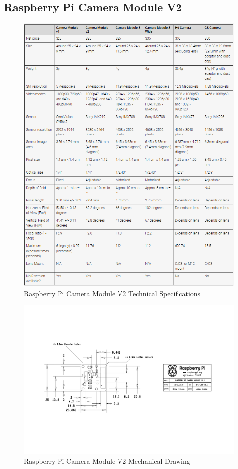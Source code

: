 \subsection{Raspberry Pi Camera Module V2}

\begin{figure}[H]
    \centering
    \includegraphics[width=0.85\linewidth]{texs/appendix/data/techspecs/cameraspecs.png}
    \caption{Raspberry Pi Camera Module V2 Technical Specifications}
    \label{fig:picam-1}
\end{figure}

\begin{figure}[H]
    \centering
    \includegraphics[width=\linewidth, angle=90]{texs/appendix/data/techspecs/cameramechdraw.jpg}
    \caption{Raspberry Pi Camera Module V2 Mechanical Drawing}
    \label{fig:picam-2}
\end{figure}

